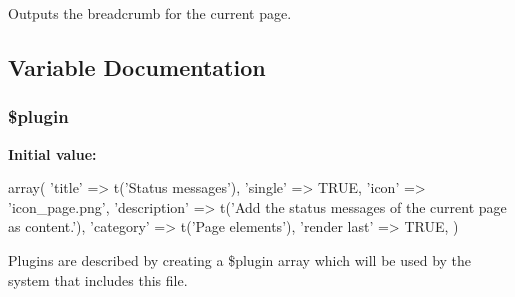 Outputs the breadcrumb for the current page. 

\subsection{Variable Documentation}
\hypertarget{page__messages_8inc_ada8a7130088351710bb02ed622d6bf65}{
\subsubsection[{\$plugin}]{\setlength{\rightskip}{0pt plus 5cm}\$plugin}}
\label{page__messages_8inc_ada8a7130088351710bb02ed622d6bf65}
{\bfseries Initial value:}
\begin{DoxyCode}
 array(
  'title' => t('Status messages'),
  'single' => TRUE,
  'icon' => 'icon_page.png',
  'description' => t('Add the status messages of the current page as content.'),
  'category' => t('Page elements'),
  'render last' => TRUE,
)
\end{DoxyCode}
Plugins are described by creating a \$plugin array which will be used by the system that includes this file. 